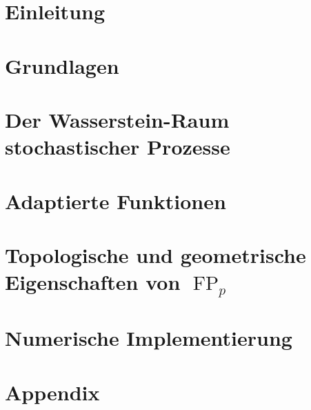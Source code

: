\documentclass[12pt]{article}
\theoremstyle{definition}
\DeclareMathOperator{\FP}{FP}
\begin{document}
\tableofcontents
\clearpage

\section{Einleitung}\label{ch:introduction}


\section{Grundlagen}\label{ch:basics}


\section{Der Wasserstein-Raum stochastischer Prozesse}\label{ch:wasserstein_space}


\section{Adaptierte Funktionen}\label{ch:adapted_functions}


\section{Topologische und geometrische Eigenschaften von \texorpdfstring{$\FP_p$}{FPp}}\label{ch:topological_properties}


\section{Numerische Implementierung}\label{ch:implementation}


\section{Appendix}


\clearpage
\printbibliography
\end{document}
